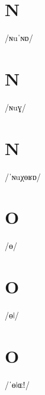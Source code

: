 \documentclass[10pt,a4paper,twoside]{book}
\begin{document}
\section*{N}

\begin{multicols}{3}
 {/ɴuˈɴɒ/} {}
\end{multicols}

\section*{N}

\begin{multicols}{3}
 {/ɴuɣ/} {}
\end{multicols}

\section*{N}

\begin{multicols}{3}
 {/ˈɴuχɵʁɒ/} {}
\end{multicols}

\section*{O}

\begin{multicols}{3}
 {/ɵ/} {}
\end{multicols}

\section*{O}

\begin{multicols}{3}
 {/ɵǀ/} {}
\end{multicols}

\section*{O}

\begin{multicols}{3}
 {/ˈɵǀɶǃ/} {}
\end{multicols}
\end{document}
